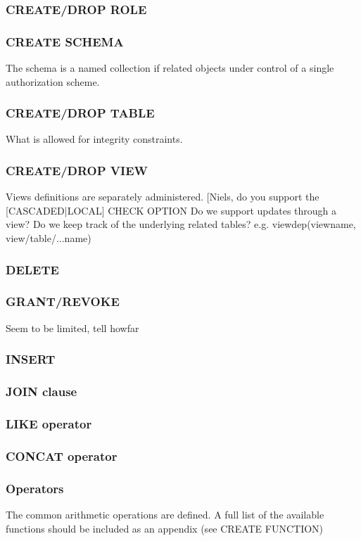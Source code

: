 \documentclass[10pt,twocolumn,fleqn]{article}
\begin{document}
\subsubsection*{CREATE/DROP ROLE}
\subsubsection*{CREATE SCHEMA}
The schema is a named collection if related objects under control of
a single authorization scheme. 

\subsubsection*{CREATE/DROP TABLE}
What is allowed for integrity constraints.

\subsubsection*{CREATE/DROP VIEW}
Views definitions are separately administered.
[Niels, do you support the [CASCADED|LOCAL] CHECK OPTION
Do we support updates through a view?
Do we keep track of the underlying related tables? e.g.
viewdep(viewname, view/table/...name)

\subsubsection*{DELETE}
\subsubsection*{GRANT/REVOKE}
Seem to be limited, tell howfar

\subsubsection*{INSERT}
\subsubsection*{JOIN clause}
\subsubsection*{LIKE operator}
\subsubsection*{CONCAT operator}
\subsubsection*{Operators}
The common arithmetic operations are defined. A full list of the
available functions should be included as an appendix (see CREATE FUNCTION)
\end{document}

